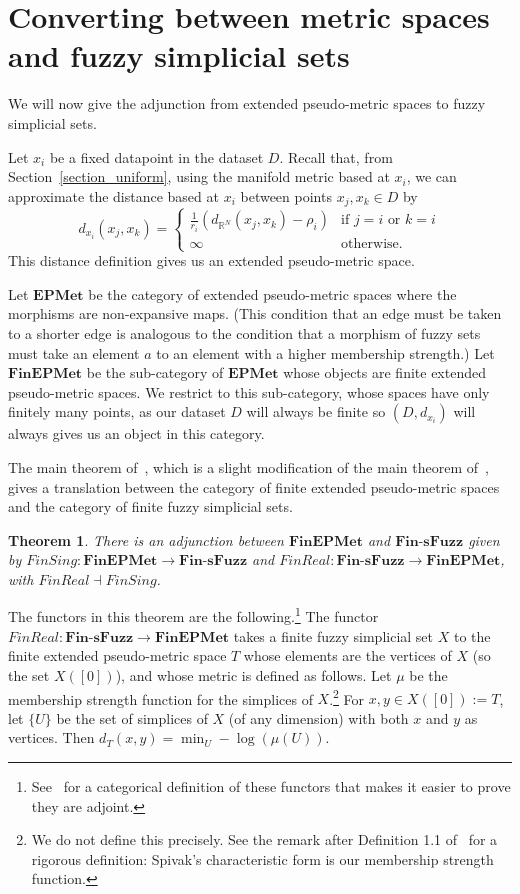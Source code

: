 \documentclass[a4paper,11pt,leqno]{article} \usepackage{amsmath}
\newcommand{\RR}{\mathbb{R}} \newcommand{\QQ}{\mathbb{Q}}
\newtheorem*{thm}{Theorem}
\theoremstyle{definition}
\begin{document}
\section{Converting between metric spaces and fuzzy simplicial sets}
\label{section_adjunction}

We will now give the adjunction from extended pseudo-metric spaces to fuzzy
simplicial sets.

Let $x_i$ be a fixed datapoint in the dataset $D$.
Recall that, from Section~\ref{section_uniform}, using the manifold metric
based at $x_i$, we can approximate the distance based at $x_i$ between points
$x_j, x_k\in D$ by 
$$d_{x_i}(x_j, x_k) = \begin{cases}
  \frac{1}{r_i}(d_{\RR^N}(x_j, x_k)-\rho_i) & \text{if $j = i$ or $k = i$}\\
\infty	& \text{otherwise.} \end{cases}$$ 
This distance definition gives us an extended pseudo-metric space.

Let $\textbf{EPMet}$ be the category of extended pseudo-metric spaces where the
morphisms are non-expansive maps.
(This condition that an edge must be taken to a shorter edge is analogous to
the condition that a morphism of fuzzy sets must take an element $a$ to an
element with a higher membership strength.)
Let $\textbf{FinEPMet}$ be the sub-category of $\textbf{EPMet}$ whose objects
are finite extended pseudo-metric spaces.
We restrict to this sub-category, whose spaces have only finitely many points,
as our dataset $D$ will always be finite so $(D, d_{x_i})$ will always gives us
an object in this category.

The main theorem of~\cite{McInnes18}, which is a slight modification of the main
theorem of~\cite{Spivak}, gives a translation between the category of finite
extended pseudo-metric spaces and the category of finite fuzzy simplicial sets.

\begin{thm} There is an adjunction between $\textbf{FinEPMet}$ and
  $\textbf{Fin-sFuzz}$ given by $FinSing: \textbf{FinEPMet}\to
  \textbf{Fin-sFuzz}$ and $FinReal: \textbf{Fin-sFuzz}\to \textbf{FinEPMet}$,
  with $FinReal\dashv FinSing$.
\end{thm}

The functors in this theorem are the following.\footnote{
  See~\cite[Section 2]{McInnes18} for a categorical definition of
  these functors that makes it easier to prove they are adjoint.
}
The functor $FinReal: \textbf{Fin-sFuzz}\to\textbf{FinEPMet}$ takes a finite
fuzzy simplicial set $X$ to the finite extended pseudo-metric space $T$ whose
elements are the vertices of $X$ (so the set $X([0])$), and whose metric is
defined as follows.
Let $\mu$ be the membership strength function for the simplices of $X$.\footnote{
  We do not define this precisely.
  See the remark after Definition 1.1 of~\cite{Spivak} for a rigorous
  definition: Spivak's characteristic form is our membership strength function.
}
For $x, y\in X([0]) := T$, let $\{U\}$ be the set of simplices of $X$ (of any
dimension) with both $x$ and $y$ as vertices.
Then $d_T(x, y) = \min_{U}-\log(\mu(U)).$
\end{document}
